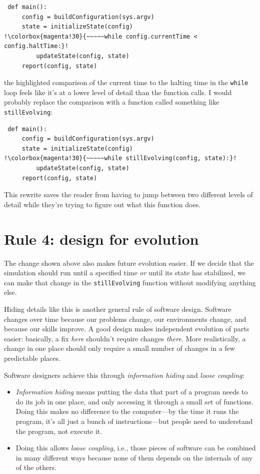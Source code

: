 \documentclass[10pt,letterpaper]{article}
\begin{document}
\begin{lstlisting}
 def main():
     config = buildConfiguration(sys.argv)
     state = initializeState(config)
!\colorbox{magenta!30}{~~~~~while config.currentTime < config.haltTime:}!
         updateState(config, state)
     report(config, state)
\end{lstlisting}

\noindent
the highlighted comparison of the current time to the halting time in the \texttt{while} loop
feels like it's at a lower level of detail than the function calls.
I would probably replace the comparison with a function called something like \texttt{stillEvolving}:

\begin{lstlisting}
 def main():
     config = buildConfiguration(sys.argv)
     state = initializeState(config)
!\colorbox{magenta!30}{~~~~~while stillEvolving(config, state):}!
         updateState(config, state)
     report(config, state)
\end{lstlisting}

\noindent
This rewrite saves the reader
from having to jump between two different levels of detail
while they're trying to figure out what this function does.

\section*{Rule 4: design for evolution}

The change shown above also makes future evolution easier.
If we decide that the simulation should run until a specified time
\emph{or} until its state has stabilized,
we can make that change in the \texttt{stillEvolving} function
without modifying anything else.

Hiding details like this is another general rule of software design.
Software changes over time because our problems change,
our environments change,
and because our skills improve.
A good design makes independent evolution of parts easier:
basically,
a fix \emph{here} shouldn't require changes \emph{there}.
More realistically,
a change in one place should only require a small number of changes
in a few predictable places.

Software designers achieve this through \emph{information hiding}
and \emph{loose coupling}:

\begin{itemize}

\item
  \emph{Information hiding} means
  putting the data that part of a program needs to do its job in one place,
  and only accessing it through a small set of functions.
  Doing this makes no difference to the computer---by the time it runs the program,
  it's all just a bunch of instructions---but
  people need to understand the program,
  not execute it.

\item
  Doing this allows \emph{loose coupling},
  i.e.,
  those pieces of software can be combined in many different ways
  because none of them depends on the internals of any of the others.

\end{itemize}
\end{document}
